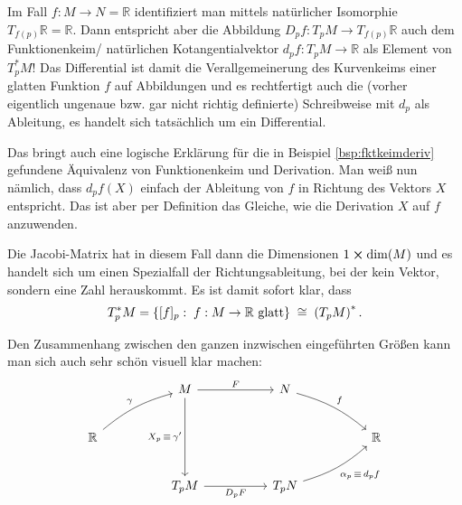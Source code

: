\documentclass[../H_Analysis_main.tex]{subfiles}
\begin{document}
\begin{bsp}
Im Fall  $f: M \rightarrow N = \mathbb{R}$ identifiziert man mittels natürlicher Isomorphie $T_{f(p)} \mathbb{R} = \mathbb{R}$. Dann entspricht aber die Abbildung $D_p f: T_p M \rightarrow T_{f(p)} \mathbb{R}$ auch dem Funktionenkeim/ natürlichen Kotangentialvektor $d_p f: T_p M \rightarrow \mathbb{R}$ als Element von $T_p^* M$! Das Differential ist damit die Verallgemeinerung des Kurvenkeims einer glatten Funktion $f$ auf Abbildungen und es rechtfertigt auch die (vorher eigentlich ungenaue bzw. gar nicht richtig definierte) Schreibweise mit $d_p$ als Ableitung, es handelt sich tatsächlich um ein Differential.


Das bringt auch eine logische Erklärung für die in Beispiel \ref{bsp:fktkeimderiv} gefundene Äquivalenz von Funktionenkeim und Derivation. Man weiß nun nämlich, dass $d_p f(X)$ einfach der Ableitung von $f$ in Richtung des Vektors $X$ entspricht. Das ist aber per Definition das Gleiche, wie die Derivation $X$ auf $f$ anzuwenden.


Die Jacobi-Matrix hat in diesem Fall dann die Dimensionen $1 \cross \dim(M)$ und es handelt sich um einen Spezialfall der Richtungsableitung, bei der kein Vektor, sondern eine Zahl herauskommt. Es ist damit sofort klar, dass
\begin{equation}
T^*_p M = \qty{[f]_p: \; f: M \rightarrow \mathbb{R} \text{ glatt}} \; \cong \; \qty(T_p M)^* \, .
\end{equation}
\end{bsp}

Den Zusammenhang zwischen den ganzen inzwischen eingeführten Größen kann man sich auch sehr schön visuell klar machen:
$$
\begin{tikzcd}[row sep = 24, column sep = 50]
& M \arrow[swap]{dd}{X_p \, \equiv \, \gamma'} \arrow{r}{F} & N %
\arrow[bend left = 12]{dr}{f} & \\
\mathbb{R} \arrow[bend left = 12]{ur}{\gamma} &  &  & \mathbb{R} \\
& T_p M  \arrow[swap]{r}{D_p F} & T_p N \arrow[bend right = 12, swap]{ur}{\alpha_p \, \equiv \, d_p f} &
\end{tikzcd}
$$
\end{document}
